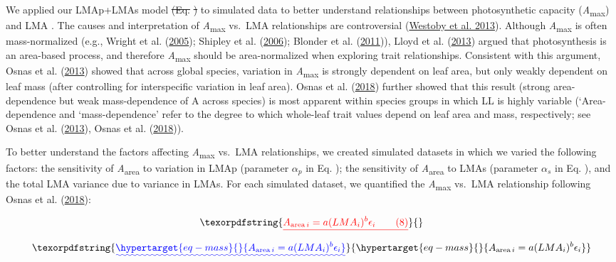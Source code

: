 \documentclass[
  12pt,
  a4paper,
,tablecaptionabove
]{scrartcl}
\providecommand{\DIFaddtex}[1]{{\protect\color{blue}\uwave{#1}}} %
\providecommand{\DIFdeltex}[1]{{\protect\color{red}\sout{#1}}}                      %
\providecommand{\DIFaddbegin}{} %
\providecommand{\DIFaddend}{} %
\providecommand{\DIFdelbegin}{} %
\providecommand{\DIFdelend}{} %
\providecommand{\DIFadd}[1]{\texorpdfstring{\DIFaddtex{#1}}{#1}} %
\providecommand{\DIFdel}[1]{\texorpdfstring{\DIFdeltex{#1}}{}} %
\newcommand{\DIFscaledelfig}{0.5}
\newlength{\DIFdelgraphicswidth} %
\newlength{\DIFdelgraphicsheight} %
\newcommand{\DIFaddincludegraphics}[2][]{{\color{blue}\fbox{\DIFOincludegraphics[#1]{#2}}}} %
\newcommand{\DIFdelincludegraphics}[2][]{%
\sbox{\DIFdelgraphicsbox}{\DIFOincludegraphics[#1]{#2}}%
\settoboxwidth{\DIFdelgraphicswidth}{\DIFdelgraphicsbox} %
\settoboxtotalheight{\DIFdelgraphicsheight}{\DIFdelgraphicsbox} %
\scalebox{\DIFscaledelfig}{%
\parbox[b]{\DIFdelgraphicswidth}{\usebox{\DIFdelgraphicsbox}\\[-\baselineskip] \rule{\DIFdelgraphicswidth}{0em}}\llap{\resizebox{\DIFdelgraphicswidth}{\DIFdelgraphicsheight}{%
\setlength{\unitlength}{\DIFdelgraphicswidth}%
\begin{picture}(1,1)%
\thicklines\linethickness{2pt} %
{\color[rgb]{1,0,0}\put(0,0){\framebox(1,1){}}}%
{\color[rgb]{1,0,0}\put(0,0){\line( 1,1){1}}}%
{\color[rgb]{1,0,0}\put(0,1){\line(1,-1){1}}}%
\end{picture}%
}\hspace*{3pt}}} %
} %
\DeclareRobustCommand{\DIFaddbegin}{\DIFOaddbegin \let\includegraphics\DIFaddincludegraphics} %
\DeclareRobustCommand{\DIFaddend}{\DIFOaddend \let\includegraphics\DIFOincludegraphics} %
\DeclareRobustCommand{\DIFdelbegin}{\DIFOdelbegin \let\includegraphics\DIFdelincludegraphics} %
\DeclareRobustCommand{\DIFdelend}{\DIFOaddend \let\includegraphics\DIFOincludegraphics} %
\begin{document}
We applied our LMAp+LMAs model \DIFdelbegin \DIFdel{(Eq. }%
\DIFdel{) }\DIFdelend to simulated data to better understand
relationships between photosynthetic capacity
(\emph{A}\textsubscript{max}) and LMA \DIFaddbegin \DIFadd{(Eq. \ref{eq:Aarea})}\DIFaddend . The causes
and interpretation of \emph{A}\textsubscript{max} vs.~LMA relationships
are controversial (\protect\hyperlink{ref-Westoby2013}{Westoby et al.
2013}). Although \emph{A}\textsubscript{max} is often mass-normalized
(e.g., Wright et al. (\protect\hyperlink{ref-Wright2005}{2005}); Shipley
et al. (\protect\hyperlink{ref-Shipley2006}{2006}); Blonder et al.
(\protect\hyperlink{ref-Blonder2011}{2011})), Lloyd et al.
(\protect\hyperlink{ref-Lloyd2013}{2013}) argued that photosynthesis is
an area-based process, and therefore \emph{A}\textsubscript{max} should
be area-normalized when exploring trait relationships. Consistent with
this argument, Osnas et al. (\protect\hyperlink{ref-Osnas2013}{2013})
showed that across global species, variation in
\emph{A}\textsubscript{max} is strongly dependent on leaf area, but only
weakly dependent on leaf mass (after controlling for interspecific
variation in leaf area). Osnas et al.
(\protect\hyperlink{ref-Osnas2018}{2018}) further showed that this
result (strong area-dependence but weak mass-dependence of A across
species) is most apparent within species groups in which LL is highly
variable (`Area-dependence and `mass-dependence' refer to the degree to
which whole-leaf trait values depend on leaf area and mass,
respectively; see Osnas et al.
(\protect\hyperlink{ref-Osnas2013}{2013}), Osnas et al.
(\protect\hyperlink{ref-Osnas2018}{2018})).

To better understand the factors affecting \emph{A}\textsubscript{max}
vs.~LMA relationships, we created simulated datasets in which we varied
the following factors: the sensitivity of \emph{A}\textsubscript{area}
to variation in LMAp (parameter \(\alpha_p\) in Eq. \DIFdelbegin %
\DIFdelend \DIFaddbegin \DIFadd{\ref{eq:Aarea}}\DIFaddend ); the
sensitivity of \emph{A}\textsubscript{area} to LMAs (parameter
\(\alpha_s\) in Eq. \DIFdelbegin %
\DIFdelend \DIFaddbegin \DIFadd{\ref{eq:Aarea}}\DIFaddend ), and the total LMA variance due to
variance in LMAs. For each simulated dataset, we quantified the
\emph{A}\textsubscript{max} vs.~LMA relationship following Osnas et al.
(\protect\hyperlink{ref-Osnas2018}{2018}):

\DIFdelbegin \begin{align*}
\DIFdel{A_{\mathrm{area} \, i} = a (LMA_i)^{b}\epsilon_i \tag{8}
}\end{align*}%
\DIFdelend \DIFaddbegin \begin{equation}\DIFadd{\protect\hypertarget{eq-mass}{}{
A_{\mathrm{area} \, i} = a (LMA_i)^{b}\epsilon_i
}\label{eq-mass}}\end{equation}\DIFaddend 
\end{document}
